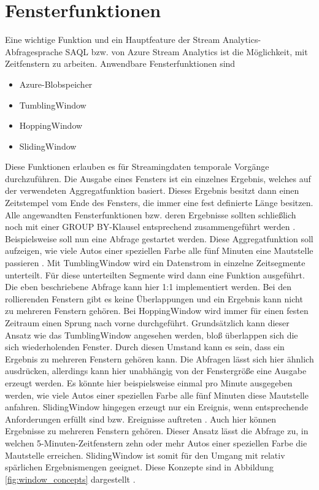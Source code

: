 \section{Fensterfunktionen}
Eine wichtige Funktion und ein Hauptfeature der Stream Analytics-Abfragesprache SAQL bzw. von Azure Stream Analytics ist die Möglichkeit, mit Zeitfenstern zu arbeiten. Anwendbare Fensterfunktionen sind \cite{Prosise.}
\begin{itemize}
\item Azure-Blobspeicher 
\item TumblingWindow
\item HoppingWindow
\item SlidingWindow
\end{itemize}
Diese Funktionen erlauben es für Streamingdaten temporale Vorgänge durchzuführen. Die Ausgabe eines Fensters ist ein einzelnes Ergebnis, welches auf der verwendeten Aggregatfunktion basiert. Dieses Ergebnis besitzt dann einen Zeitstempel vom Ende des Fensters, die immer eine fest definierte Länge besitzen. Alle angewandten Fensterfunktionen bzw. deren Ergebnisse sollten schließlich noch mit einer GROUP BY-Klausel entsprechend zusammengeführt werden \cite{Azure.2017}. 
Beispielsweise soll nun eine Abfrage gestartet werden. Diese Aggregatfunktion soll aufzeigen, wie viele Autos einer speziellen Farbe alle fünf Minuten eine Mautstelle passieren \cite{Prosise.}. Mit TumblingWindow wird ein Datenstrom in einzelne Zeitsegmente unterteilt. Für diese unterteilten Segmente wird dann eine Funktion ausgeführt. Die eben beschriebene Abfrage kann hier 1:1 implementiert werden. Bei den rollierenden Fenstern gibt es keine Überlappungen und ein Ergebnis kann nicht zu mehreren Fenstern gehören. Bei HoppingWindow wird immer für einen festen Zeitraum einen Sprung nach vorne durchgeführt. Grundsätzlich kann dieser Ansatz wie das TumblingWindow angesehen werden, bloß überlappen sich die sich wiederholenden Fenster. Durch diesen Umstand kann es sein, dass ein Ergebnis zu mehreren Fenstern gehören kann. Die Abfragen lässt sich hier ähnlich ausdrücken, allerdings kann hier unabhängig von der Fenstergröße eine Ausgabe erzeugt werden. Es könnte hier beispielsweise einmal pro Minute ausgegeben werden, wie viele Autos einer speziellen Farbe alle fünf Minuten diese Mautstelle anfahren. SlidingWindow hingegen erzeugt nur ein Ereignis, wenn entsprechende Anforderungen erfüllt sind bzw. Ereignisse auftreten \cite{Azure.2017}. Auch hier können Ergebnisse zu mehreren Fenstern gehören. Dieser Ansatz lässt die Abfrage zu, in welchen 5-Minuten-Zeitfenstern zehn oder mehr Autos einer speziellen Farbe die Mautstelle erreichen. SlidingWindow ist somit für den Umgang mit relativ spärlichen Ergebnismengen geeignet. Diese Konzepte sind in Abbildung \ref{fig:window_concepts} dargestellt \cite{Prosise.}.
\\ \\

